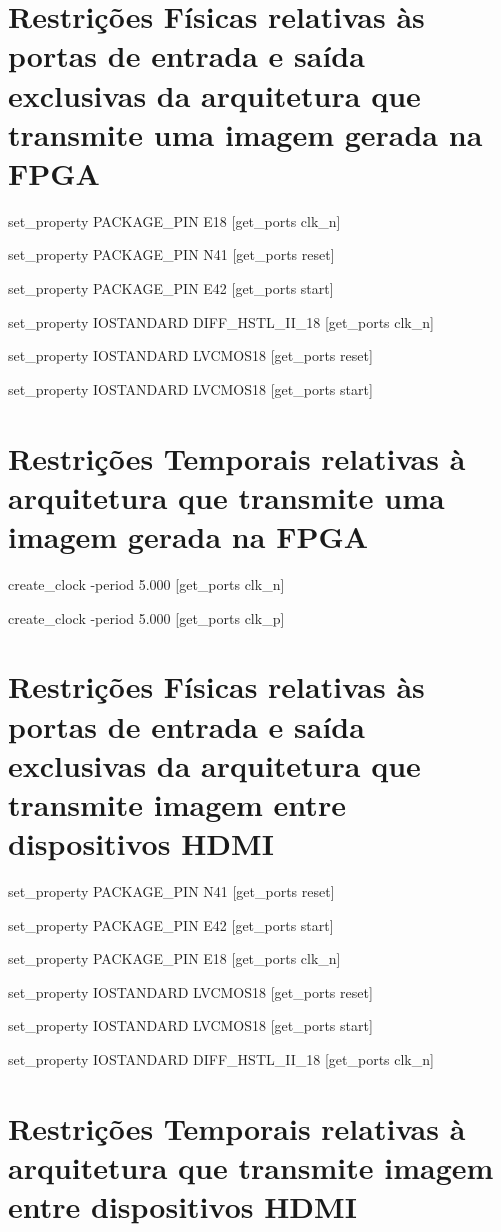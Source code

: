 \section{Restrições Físicas relativas às portas de entrada e saída exclusivas da arquitetura que transmite uma imagem gerada na FPGA} \label{ap:fisicas_planA_especificas}
\small{
set\_property PACKAGE\_PIN E18 [get\_ports clk\_n]

set\_property PACKAGE\_PIN N41 [get\_ports reset]

set\_property PACKAGE\_PIN E42 [get\_ports start]

set\_property IOSTANDARD DIFF\_HSTL\_II\_18 [get\_ports clk\_n]

set\_property IOSTANDARD LVCMOS18 [get\_ports reset]

set\_property IOSTANDARD LVCMOS18 [get\_ports start]

}

\section{Restrições Temporais relativas à arquitetura que transmite uma imagem gerada na FPGA} \label{ap:temporais_planA}

\small{
	
	create\_clock -period 5.000 [get\_ports clk\_n]
	
	create\_clock -period 5.000 [get\_ports clk\_p]}

\section{Restrições Físicas relativas às portas de entrada e saída exclusivas da arquitetura que transmite imagem entre dispositivos HDMI} \label{ap:fisicas_planB_especificas}

\small{
set\_property PACKAGE\_PIN N41 [get\_ports reset]

set\_property PACKAGE\_PIN E42 [get\_ports start]

set\_property PACKAGE\_PIN E18 [get\_ports clk\_n]

set\_property IOSTANDARD LVCMOS18 [get\_ports reset]

set\_property IOSTANDARD LVCMOS18 [get\_ports start]

set\_property IOSTANDARD DIFF\_HSTL\_II\_18 [get\_ports clk\_n]

}
\section{Restrições Temporais relativas à arquitetura que transmite imagem entre dispositivos HDMI} \label{ap:temporais_planB}

